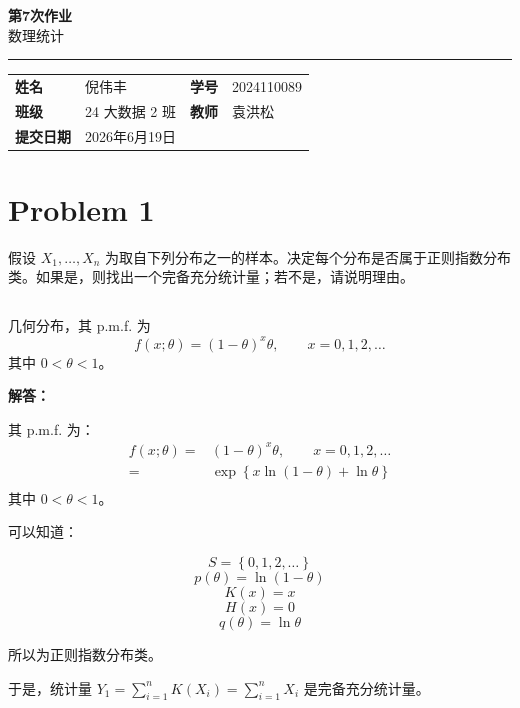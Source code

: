 \documentclass[12pt,a4paper]{article}
\newcommand{\course}{数理统计}
\newcommand{\homeworktitle}{第7次作业}
\newcommand{\studentname}{倪伟丰}
\newcommand{\studentid}{2024110089}
\newcommand{\classname}{24 大数据 2 班}
\newcommand{\teacher}{袁洪松}
\newcommand{\duedate}{2026年6月19日}
\begin{document}
\begin{center}
  {\Huge\bfseries\color{mainblue}\homeworktitle}\\[0.6em]
  {\Large\course}\\[1.2em]
  {\color{linegray}\rule{0.9\textwidth}{0.8pt}}
\end{center}

\begin{infobox}
\begin{tabularx}{\textwidth}{>{\bfseries}p{2.2cm} X >{\bfseries}p{2.2cm} X}
姓名 & \studentname & 学号 & \studentid \\
班级 & \classname & 教师 & \teacher \\
提交日期 & \duedate &  &  \\
\end{tabularx}
\end{infobox}


\section{Problem 1}

假设 $X_1,\ldots,X_n$ 为取自下列分布之一的样本。决定每个分布是否属于正则指数分布类。如果是，则找出一个完备充分统计量；若不是，请说明理由。


\subsection{} 
 
几何分布，其 p.m.f. 为
    \[
        f(x;\theta)=(1-\theta)^x\theta,\qquad x=0,1,2,\ldots
    \]
    其中 $0<\theta<1$。

\begin{answerbox}
\textbf{解答：}

其 p.m.f. 为：
\[
\begin{aligned}
f(x;\theta)=&(1-\theta)^x\theta,\qquad x=0,1,2,\ldots \\
=& \exp\left\{x\ln(1-\theta)+\ln\theta\right\} \\
\end{aligned}
\]
其中 $0<\theta<1$。

可以知道：

$$
S = \left\{0, 1, 2, \ldots\right\}
$$
$$
p(\theta) = \ln (1-\theta)
$$
$$
K(x) = x
$$
$$
H(x) = 0
$$
$$
q(\theta) = \ln \theta
$$

所以为正则指数分布类。

于是，统计量 $Y_1 = \sum_{i=1}^{n} K(X_i) = \sum_{i=1}^{n} X_i$ 是完备充分统计量。

\end{answerbox}
\end{document}
